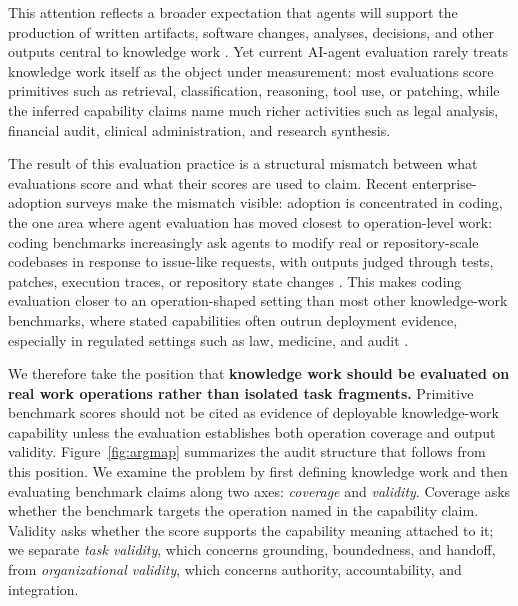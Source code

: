 \documentclass{article}
\begin{document}
This attention reflects a broader expectation that agents will support the production of written artifacts, software changes, analyses, decisions, and other outputs central to knowledge work \citep{davenport2005thinking,brynjolfsson2026playbook,dellacqua2023jagged}.
Yet current AI-agent evaluation rarely treats knowledge work itself as the object under measurement: most evaluations score primitives such as retrieval, classification, reasoning, tool use, or patching, while the inferred capability claims name much richer activities such as legal analysis, financial audit, clinical administration, and research synthesis. 

The result of this evaluation practice is a structural mismatch between what evaluations score and what their scores are used to claim.
Recent enterprise-adoption surveys \citep{a16z2026adoption,brynjolfsson2026playbook} make the mismatch visible: adoption is concentrated in coding, the one area where agent evaluation has moved closest to operation-level work: coding benchmarks increasingly ask agents to modify real or repository-scale codebases in response to issue-like requests, with outputs judged through tests, patches, execution traces, or repository state changes \citep{jimenez2024swebench,kottamasu2026apex,swebenchpro2025}.
This makes coding evaluation closer to an operation-shaped setting than most other knowledge-work benchmarks, where stated capabilities often outrun deployment evidence, especially in regulated settings such as law, medicine, and audit \citep{kellogg2020algorithms,dellacqua2023jagged}.

We therefore take the position that 
\textbf{knowledge work should be evaluated on real work operations rather than isolated task fragments.} Primitive benchmark scores should not be cited as evidence of deployable knowledge-work capability unless the evaluation establishes both operation coverage and output validity.
Figure~\ref{fig:argmap} summarizes the audit structure that follows from this position.
We examine the problem by first defining knowledge work and then evaluating benchmark claims along two axes: \textit{coverage} and \textit{validity}.
Coverage asks whether the benchmark targets the operation named in the capability claim.
Validity asks whether the score supports the capability meaning attached to it; we separate \textit{task validity}, which concerns grounding, boundedness, and handoff, from \textit{organizational validity}, which concerns authority, accountability, and integration.
\end{document}
